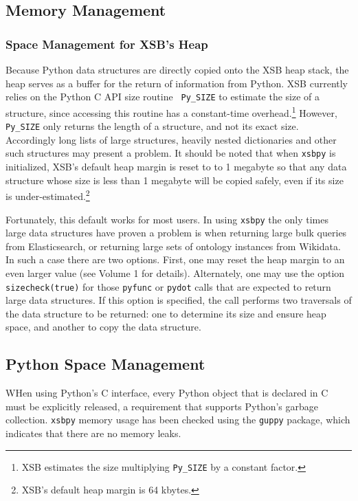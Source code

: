 \subsection{Memory Management} \label{sec:xsbpy-memory}

\subsubsection{Space Management for XSB's Heap}
Because Python data structures are directly copied onto the XSB heap
stack, the heap serves as a buffer for the return of information from
Python.  XSB currently relies on the Python C API size routine {\tt
  Py\_SIZE} to estimate the size of a structure, since accessing this
routine has a constant-time overhead.\footnote{XSB estimates the size
  multiplying {\tt Py\_SIZE} by a constant factor.}  However, {\tt
  Py\_SIZE} only returns the length of a structure, and not its exact
size.  Accordingly long lists of large structures, heavily nested
dictionaries and other such structures may present a problem.  It
should be noted that when {\tt xsbpy} is initialized, XSB's default
heap margin is reset to to 1 megabyte so that any data structure whose
size is less than 1 megabyte will be copied safely, even if its size
is under-estimated.\footnote{XSB's default heap margin is 64 kbytes.}

Fortunately, this default works for most users.  In using {\tt xsbpy}
the only times large data structures have proven a problem is when
returning large bulk queries from Elasticsearch, or returning large
sets of ontology instances from Wikidata.  In such a case there are
two options.  First, one may reset the heap margin to an even larger
value (see Volume 1 for details).  Alternately, one may use the option
{\tt sizecheck(true)} for those {\tt pyfunc} or {\tt pydot} calls that
are expected to return large data structures.  If this option is
specified, the call performs two traversals of the data structure to
be returned: one to determine its size and ensure heap space, and another
to copy the data structure.

\subsection{Python Space Management}

WHen using Python's C interface, every Python object that is declared
in C must be explicitly released, a requirement that supports Python's
garbage collection.  {\tt xsbpy} memory usage has been checked using
the {\tt guppy} package, which indicates that there are no memory
leaks.

